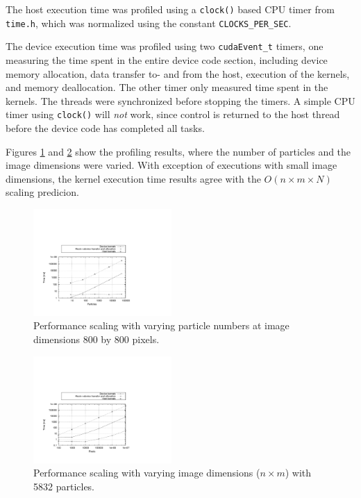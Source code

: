 \documentclass[journal]{IEEEtran}
\begin{document}
The host execution time was profiled using a \texttt{clock()} based CPU timer from \texttt{time.h}, which was normalized using the constant \texttt{CLOCKS\_PER\_SEC}. 

The device execution time was profiled using two \texttt{cudaEvent\_t} timers, one measuring the time spent in the entire device code section, including device memory allocation, data transfer to- and from the host, execution of the kernels, and memory deallocation. The other timer only measured time spent in the kernels. The threads were synchronized before stopping the timers. A simple CPU timer using \texttt{clock()} will \emph{not} work, since control is returned to the host thread before the device code has completed all tasks.

Figures \ref{fig:np-performance.pdf} and \ref{fig:px-performance.pdf} show the profiling results, where the number of particles and the image dimensions were varied. With exception of executions with small image dimensions, the kernel execution time results agree with the $O(n \times m \times N)$ scaling predicion.

\begin{figure}[!t]
\centering
\includegraphics[width=0.47\textwidth]{np-performance.pdf}
\caption{Performance scaling with varying particle numbers at image dimensions 800 by 800 pixels.}
\label{fig:np-performance.pdf}
\end{figure}

\begin{figure}[!t]
\centering
\includegraphics[width=0.47\textwidth]{px-performance.pdf}
\caption{Performance scaling with varying image dimensions ($n \times m$) with 5832 particles.}
\label{fig:px-performance.pdf}
\end{figure}
\end{document}
